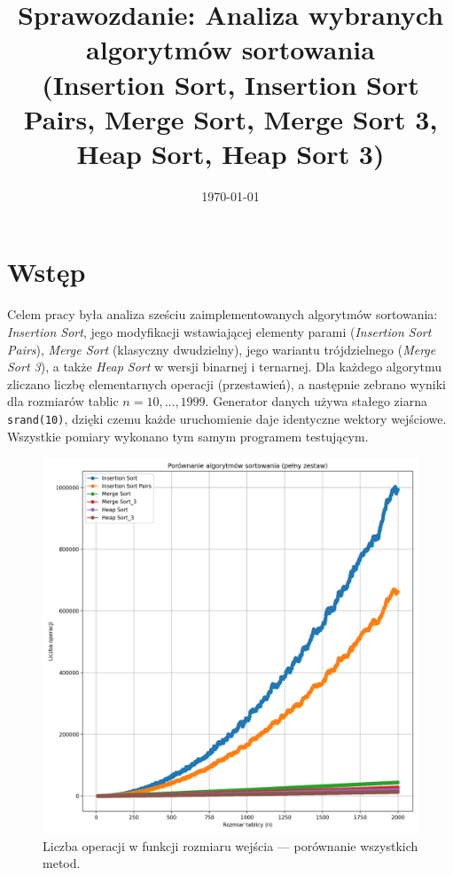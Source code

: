 \documentclass[11pt,a4paper]{article}
\title{Sprawozdanie: Analiza wybranych algorytmów sortowania\\
{\large (Insertion Sort, Insertion Sort Pairs, Merge Sort, Merge Sort 3, Heap Sort, Heap Sort 3)}}
\author{}
\date{\today}
\begin{document}
\maketitle

\section{Wstęp}
Celem pracy była analiza sześciu zaimplementowanych algorytmów sortowania: \emph{Insertion Sort}, jego modyfikacji wstawiającej elementy parami (\emph{Insertion Sort Pairs}), \emph{Merge Sort} (klasyczny dwudzielny), jego wariantu trójdzielnego (\emph{Merge Sort 3}), a także \emph{Heap Sort} w wersji binarnej i ternarnej.
Dla każdego algorytmu zliczano liczbę elementarnych operacji (przestawień), a następnie zebrano wyniki dla rozmiarów tablic $n=10,\dots,1999$. Generator danych używa stałego ziarna \texttt{srand(10)}, dzięki czemu każde uruchomienie daje identyczne wektory wejściowe.
Wszystkie pomiary wykonano tym samym programem testującym.

\begin{figure}[h]
  \centering
  \includegraphics[width=.68\textwidth]{operations_all.png}
  \caption{Liczba operacji w funkcji rozmiaru wejścia --- porównanie wszystkich metod.}
  \label{fig:all}
\end{figure}
\end{document}
